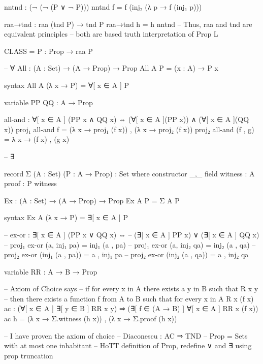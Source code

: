 nntnd : (¬ (¬  (P ∨ ¬ P))) 
nntnd f = f (inj₂ (λ p → f (inj₁ p)))

raa→tnd : raa (tnd P) → tnd P
raa→tnd h = h nntnd
-- Thus, raa and tnd are equivalent principles
-- both are based truth interpretation of Prop L

CLASS = {P : Prop} → raa P

-- ∀ 
All : (A : Set) → (A → Prop) → Prop
All A P = (x : A) → P x

syntax All A (λ x → P) = ∀[ x ∈ A ] P

variable PP QQ : A → Prop

all-and : ∀[ x ∈ A ] (PP x ∧ QQ x) ⇔ 
    (∀[ x ∈ A ](PP x)) ∧ (∀[ x ∈ A ](QQ x))
proj₁ all-and f  = (λ x →  proj₁ (f x)) , (λ x →  proj₂ (f x))
proj₂ all-and  (f , g) = λ x → (f x)  , (g x)

-- ∃

record Σ (A : Set) (P : A → Prop) : Set where
  constructor _,_
  field
    witness : A
    proof   : P witness

Ex : (A : Set) → (A → Prop) → Prop
Ex A P = Σ A P

syntax Ex A (λ x → P) = ∃[ x ∈ A ] P

-- ex-or : ∃[ x ∈ A ] (PP x ∨ QQ x) ⇔ 
--    (∃[ x ∈ A ] PP x) ∨ (∃[ x ∈ A ] QQ x)
-- proj₁ ex-or (a, inj₁ pa) = inj₁ (a , pa)
-- proj₁ ex-or (a, inj₂ qa) = inj₂ (a , qa)
-- proj₂ ex-or (inj₁ (a , pa)) = a , inj₁ pa
-- proj₂ ex-or (inj₂ (a , qa)) = a , inj₂ qa

variable RR : A → B → Prop

-- Axiom of Choice says 
-- if for every x in A there exists a y in B such that R x y
-- then there exists a function f from A to B such that for every x in A R x (f x)
ac : (∀[ x ∈ A ] ∃[ y ∈ B ] RR x y) ⇒ 
     (∃[ f ∈ (A → B) ] ∀[ x ∈ A ] RR x (f x))
ac h = (λ x → Σ.witness (h x)) , (λ x → Σ.proof (h x))

-- I have proven the axiom of choice
-- Diaconescu : AC ⇒ TND
-- Prop = Sets with at most one inhabitant
-- HoTT definition of Prop, redefine ∨ and ∃ using prop truncation